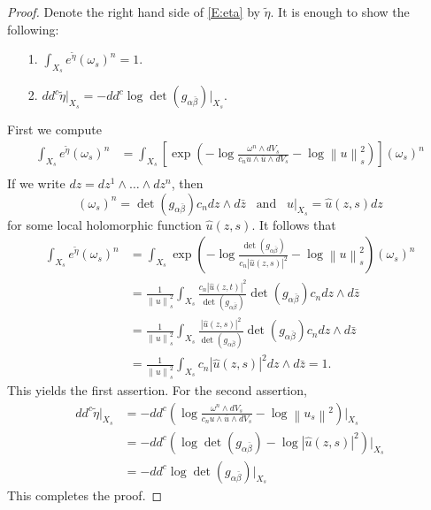 \documentclass{amsart}
\theoremstyle{definition}
\numberwithin{equation}{section}
\begin{document}
\begin{proof}
Denote the right hand side of \eqref{E:eta} by $\tilde\eta$.
It is enough to show the following:
\begin{itemize}
\item [1.]$\int_{X_s}e^{\tilde\eta}(\omega_s)^n=1$.
\item [2.]$dd^c\tilde\eta\vert_{X_s}=-dd^c\log\det(g_{\alpha\bar\beta})\vert_{X_s}.$
\end{itemize}
First we compute
\begin{align*}
\int_{X_s}e^{\tilde\eta}(\omega_s)^n
&=
\int_{X_s}\left[\exp{\left({-\log\frac{\omega^n\wedge dV_s}
	{c_n u\wedge \overline{u}\wedge dV_s}
-\log{\left\|{u}\right\|}_s^2}\right)}\right](\omega_s)^n \\
\end{align*}
If we write $dz=dz^1\wedge\dots\wedge dz^n$, then 
\begin{equation*}
(\omega_s)^n=\det(g_{\alpha\bar\beta})c_n dz\wedge d\bar z
\;\;\;\text{and}\;\;\;
u\vert_{X_s}=\hat u(z,s)dz
\end{equation*}
for some local holomorphic function $\hat u(z,s)$. It follows that
\begin{align*}
\int_{X_s}e^{\tilde\eta}(\omega_s)^n
&=
\int_{X_s}\exp
{\left({-\log\frac{\det(g_{\alpha\bar\beta})}{c_n{\left\vert{\hat u(z,s)}\right\vert}^2}-\log{\left\|{u}\right\|}_s^2
}\right)}
(\omega_s)^n \\
&=
\frac{1}{{\left\|{u}\right\|}_s^2}\int_{X_s}
\frac{c_n{\left\vert{\hat u(z,t)}\right\vert}^2}{\det(g_{\alpha\bar\beta})}
{\det(g_{\alpha\bar\beta})}c_n dz\wedge d\bar z \\
&=
\frac{1}{{\left\|{u}\right\|}_s^2}\int_{X_s}
\frac{{\left\vert{\hat u(z,s)}\right\vert}^2}{\det(g_{\alpha\bar\beta})}
{\det(g_{\alpha\bar\beta})}c_n dz\wedge d\bar z \\
&=
\frac{1}{{\left\|{u}\right\|}_s^2}\int_{X_s}
c_n{\left\vert{\hat u(z,s)}\right\vert}^2 dz\wedge d\bar z 
=1.
\end{align*}
This yields the first assertion. For the second assertion, 
\begin{align*}
dd^c\tilde\eta\vert_{X_s}
&=
-dd^c
{\left({\log\frac{\omega^n\wedge dV_s}
	{c_n u\wedge \overline{u}\wedge dV_s}-\log{\left\|{u_s}\right\|}^2
}\right)}\Big\vert_{X_s}
\\
&=
-dd^c
{\left({\log\det(g_{\alpha\bar\beta})
	-\log{\left\vert{\hat u(z,s)}\right\vert}^2
}\right)}\Big\vert_{X_s} 
\\
&=
-dd^c\log\det(g_{\alpha\bar\beta})\vert_{X_s}
\end{align*}
This completes the proof.
\end{proof}
\end{document}

